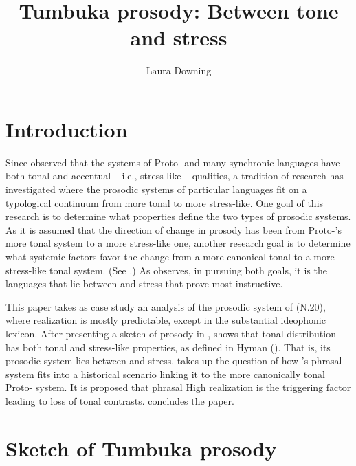 \documentclass[output=paper
,newtxmath
,modfonts
,nonflat]{langsci/langscibook}
\author{Laura Downing\affiliation{University of Gothenburg}}
\title{Tumbuka prosody: Between tone and stress}
\begin{document}
\graphicspath{{figures/}}

\maketitle

\newcommand{\OTbox}[1]{\resizebox{.9\textwidth}{!}{#1}}

\section{Introduction}\label{sec:downing:1}

Since \citet{McCawley1978} observed that the  systems of Proto- and many synchronic  languages have both tonal and accentual – i.e., stress-like – qualities, a tradition of research has investigated where the prosodic systems of particular languages fit on a typological continuum from more tonal to more stress-like. One goal of this research is to determine what properties define the two types of prosodic systems. As it is assumed that the direction of change in  prosody has been from Proto-’s more tonal system to a more stress-like one, another research goal is to determine what systemic factors favor the change from a more canonical tonal to a more stress-like tonal system. (See \citealt{Clemens&Goldsmith1984,Hyman2006,Odden1999}.) As \citet{Gussenhoven2006} observes, in pursuing both goals, it is the languages that lie between  and stress that prove most instructive.

This paper takes as case study an analysis of the prosodic system of  (N.20), where  realization is mostly predictable, except in the substantial ideophonic lexicon. After presenting a sketch of  prosody in ,  shows that  tonal distribution has both tonal and stress-like properties, as defined in Hyman (\citeyear{Hyman2012,Hyman2014}). That is, its prosodic system lies between  and stress.  takes up the question of how ’s phrasal  system fits into a historical scenario linking it to the more canonically tonal Proto- system. It is proposed that phrasal High  realization is the triggering factor leading to loss of tonal contrasts.  concludes the paper.

\section{Sketch of Tumbuka prosody}\label{sec:downing:2}
\end{document}
